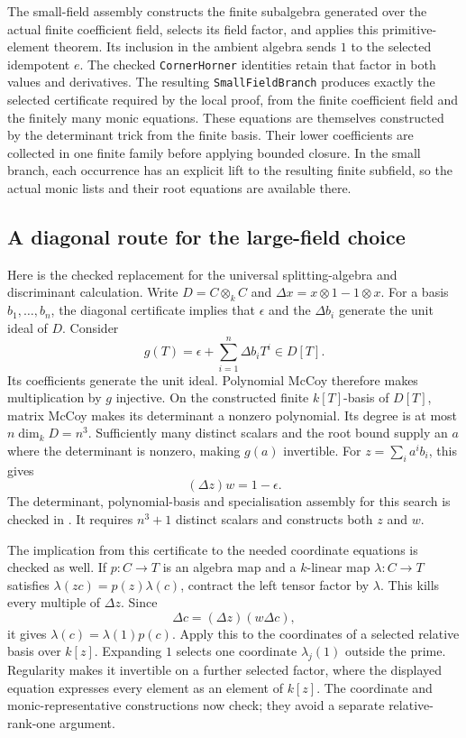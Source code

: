 \documentclass[11pt]{article}
\begin{document}
The small-field assembly constructs the finite subalgebra generated
over the actual finite coefficient field, selects its field factor,
and applies this primitive-element theorem. Its inclusion in the
ambient algebra sends $1$ to the selected idempotent $e$.
The checked \texttt{CornerHorner} identities retain that factor in
both values and derivatives. The resulting \texttt{SmallFieldBranch}
produces exactly the selected certificate required by the local proof,
from the finite coefficient field and the finitely many monic equations.
These equations are themselves constructed by the determinant trick
from the finite basis. Their lower coefficients are collected in one
finite family before applying bounded closure. In the small branch,
each occurrence has an explicit lift to the resulting finite subfield,
so the actual monic lists and their root equations are available there.

\subsection*{A diagonal route for the large-field choice}

Here is the checked replacement for the universal splitting-algebra
and discriminant calculation. Write $D=C\otimes_k C$ and
$\Delta x=x\otimes1-1\otimes x$. For a basis $b_1,\ldots,b_n$,
the diagonal certificate implies that $\epsilon$ and the
$\Delta b_i$ generate the unit ideal of $D$. Consider
\[
 g(T)=\epsilon+\sum_{i=1}^n\Delta b_i T^i\in D[T].
\]
Its coefficients generate the unit ideal. Polynomial McCoy therefore
makes multiplication by $g$ injective. On the constructed finite
$k[T]$-basis of $D[T]$, matrix McCoy makes its determinant a nonzero
polynomial. Its degree is at most $n\dim_k D=n^3$.
Sufficiently many distinct scalars and the root bound supply an $a$
where the determinant is nonzero, making $g(a)$ invertible.
For $z=\sum_i a^i b_i$, this gives
\[
 (\Delta z)w=1-\epsilon.
\]
The determinant, polynomial-basis and specialisation assembly for this
search is checked in .
It requires $n^3+1$ distinct scalars and constructs both $z$ and $w$.

The implication from this certificate to the needed coordinate
equations is checked as well. If $p:C\to T$ is an algebra map and a
$k$-linear map $\lambda:C\to T$ satisfies
$\lambda(zc)=p(z)\lambda(c)$, contract the left tensor factor by
$\lambda$. This kills every multiple of $\Delta z$. Since
\[
 \Delta c=(\Delta z)(w\Delta c),
\]
it gives $\lambda(c)=\lambda(1)p(c)$.
Apply this to the coordinates of a selected relative basis over
$k[z]$. Expanding $1$ selects one coordinate $\lambda_j(1)$ outside
the prime. Regularity makes it invertible on a further selected factor,
where the displayed equation expresses every element as an element
of $k[z]$. The coordinate and monic-representative constructions now
check; they avoid a separate relative-rank-one argument.
\end{document}
